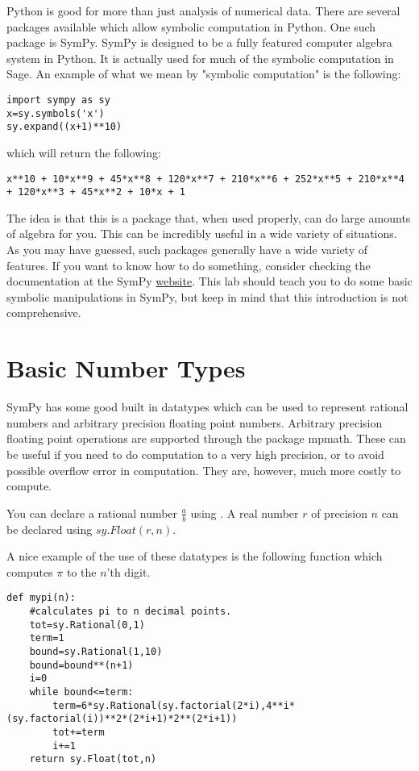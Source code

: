 \label{lab:SymPy}


Python is good for more than just analysis of numerical data.
There are several packages available which allow symbolic computation in Python.
One such package is SymPy.
SymPy is designed to be a fully featured computer algebra system in Python.
It is actually used for much of the symbolic computation in Sage.
An example of what we mean by "symbolic computation" is the following:
\begin{lstlisting}
import sympy as sy
x=sy.symbols('x')
sy.expand((x+1)**10)
\end{lstlisting}
which will return the following:
\begin{lstlisting}
x**10 + 10*x**9 + 45*x**8 + 120*x**7 + 210*x**6 + 252*x**5 + 210*x**4 + 120*x**3 + 45*x**2 + 10*x + 1
\end{lstlisting}
The idea is that this is a package that, when used properly, can do large amounts of algebra for you.
This can be incredibly useful in a wide variety of situations.
As you may have guessed, such packages generally have a wide variety of features. 
If you want to know how to do something, consider checking the documentation  at the SymPy \href{http://sympy.org/en/index.htmll}{website}.
This lab should teach you to do some basic symbolic manipulations in SymPy, but keep in mind that this introduction is not comprehensive.

\section*{Basic Number Types}
SymPy has some good built in datatypes which can be used to represent rational numbers and arbitrary precision floating point numbers.
Arbitrary precision floating point operations are supported through the package mpmath.
These can be useful if you need to do computation to a very high precision, or to avoid possible overflow error in computation.
They are, however, much more costly to compute.

You can declare a rational number $\frac{a}{b}$ using .
A real number $r$ of precision $n$ can be declared using $sy.Float(r,n)$.

A nice example of the use of these datatypes is the following function which computes $\pi$ to the $n$'th digit.
\begin{lstlisting}
def mypi(n):
    #calculates pi to n decimal points.
    tot=sy.Rational(0,1)
    term=1
    bound=sy.Rational(1,10)
    bound=bound**(n+1)
    i=0
    while bound<=term:
        term=6*sy.Rational(sy.factorial(2*i),4**i*(sy.factorial(i))**2*(2*i+1)*2**(2*i+1))
        tot+=term
        i+=1
    return sy.Float(tot,n)
\end{lstlisting}

